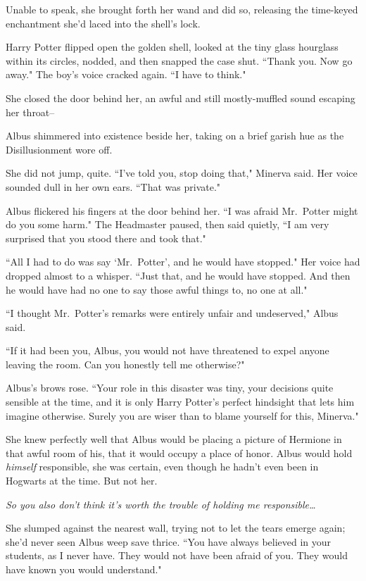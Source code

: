 Unable to speak, she brought forth her wand and did so, releasing the time-keyed enchantment she'd laced into the shell's lock.

Harry Potter flipped open the golden shell, looked at the tiny glass hourglass within its circles, nodded, and then snapped the case shut. ``Thank you. Now go away." The boy's voice cracked again. ``I have to think."

\later

She closed the door behind her, an awful and still mostly-muffled sound escaping her throat\---

Albus shimmered into existence beside her, taking on a brief garish hue as the Disillusionment wore off.

She did not jump, quite. ``I've told you, stop doing that," Minerva said. Her voice sounded dull in her own ears. ``That was private."

Albus flickered his fingers at the door behind her. ``I was afraid Mr.~Potter might do you some harm." The Headmaster paused, then said quietly, ``I am very surprised that you stood there and took that."

``All I had to do was say `Mr.~Potter', and he would have stopped." Her voice had dropped almost to a whisper. ``Just that, and he would have stopped. And then he would have had no one to say those awful things to, no one at all."

``I thought Mr.~Potter's remarks were entirely unfair and undeserved," Albus said.

``If it had been you, Albus, you would not have threatened to expel anyone leaving the room. Can you honestly tell me otherwise?"

Albus's brows rose. ``Your role in this disaster was tiny, your decisions quite sensible at the time, and it is only Harry Potter's perfect hindsight that lets him imagine otherwise. Surely you are wiser than to blame yourself for this, Minerva."

She knew perfectly well that Albus would be placing a picture of Hermione in that awful room of his, that it would occupy a place of honor. Albus would hold \emph{himself} responsible, she was certain, even though he hadn't even been in Hogwarts at the time. But not her.

\emph{So you also don't think it's worth the trouble of holding me responsible{\ldots}}

She slumped against the nearest wall, trying not to let the tears emerge again; she'd never seen Albus weep save thrice. ``You have always believed in your students, as I never have. They would not have been afraid of you. They would have known you would understand."


